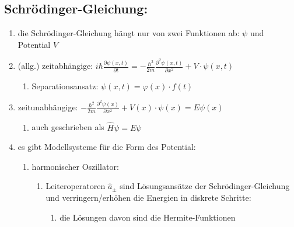 \subsection{Schrödinger-Gleichung:}\label{schroedinger}
\begin{enumerate}
    \item die Schrödinger-Gleichung hängt nur von zwei Funktionen ab: $\psi$ und Potential $V$
    \item (allg.) zeitabhängige: $i\hbar\frac{\partial\psi\left(x,t\right)}{\partial t}=-\frac{\hbar^{2}}{2m}\frac{\partial^{2}\psi\left(x,t\right)}{\partial x^{2}}+V\cdot\psi\left(x,t\right)$
    \begin{enumerate}
        \item Separationsansatz: $\psi(x,t)=\varphi(x)\cdot f(t)$
    \end{enumerate}

    \item zeitunabhängige: $-\frac{\hbar^{2}}{2m}\frac{\partial^{2}\psi\left(x\right)}{\partial x^{2}}+V(x)\cdot\psi\left(x\right)=E\psi\left(x\right)$ 
    \begin{enumerate}
        \item auch geschrieben als $\hat{H}\psi=E\psi$
    \end{enumerate}

    \item es gibt Modellsysteme für die Form des Potential:
    \begin{enumerate}
        \item harmonischer Oszillator:
        \begin{enumerate}
            \item Leiteroperatoren $\hat{a}_\pm$ sind Lösungsansätze der Schrödinger-Gleichung und 
            verringern/erhöhen die Energien in diskrete Schritte:
            \begin{enumerate}
                \item die Lösungen davon sind die Hermite-Funktionen
            \end{enumerate}
        \end{enumerate}
    \end{enumerate}
\end{enumerate}


\newpage